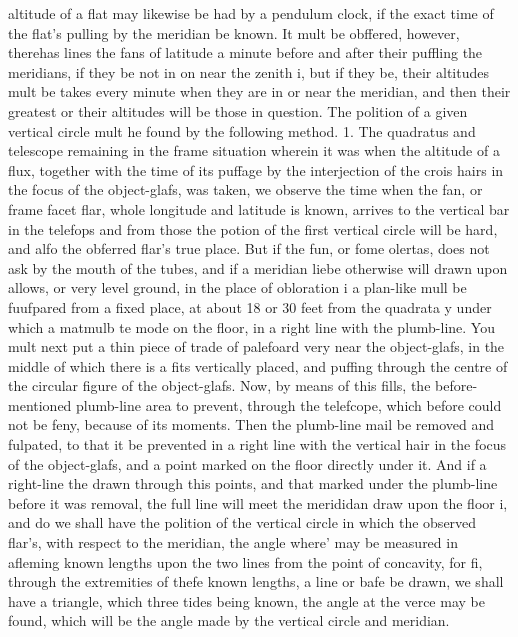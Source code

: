 altitude of a flat may likewise be had by a pendulum clock, if the exact time of the flat’s pulling by the meridian be known. It mult be obffered, however, therehas lines the fans of latitude a minute before and after their puffling the meridians, if they be not in on near the zenith i, but if they be, their altitudes mult be takes every minute when they are in or near the meridian, and then their greatest or their altitudes will be those in question. The polition of a given vertical circle mult he found by the following method. 1. The quadratus and telescope remaining in the frame situation wherein it was when the altitude of a flux, together with the time of its puffage by the interjection of the crois hairs in the focus of the object-glafs, was taken, we observe the time when the fan, or frame facet flar, whole longitude and latitude is known, arrives to the vertical bar in the telefops and from those the potion of the first vertical circle will be hard, and alfo the obferred flar's true place. But if the fun, or fome olertas, does not ask by the mouth of the tubes, and if a meridian liebe otherwise will drawn upon allows, or very level ground, in the place of obloration i a plan-like mull be fuufpared from a fixed place, at about 18 or 30 feet from the quadrata y under which a matmulb te mode on the floor, in a right line with the plumb-line. You mult next put a thin piece of trade of palefoard very near the object-glafs, in the middle of which there is a fits vertically placed, and puffing through the centre of the circular figure of the object-glafs. Now, by means of this fills, the before-mentioned plumb-line area to prevent, through the telefcope, which before could not be feny, because of its moments. Then the plumb-line mail be removed and fulpated, to that it be prevented in a right line with the vertical hair in the focus of the object-glafs, and a point marked on the floor directly under it. And if a right-line the drawn through this points, and that marked under the plumb-line before it was removal, the full line will meet the merididan draw upon the floor i, and do we shall have the polition of the vertical circle in which the observed flar's, with respect to the meridian, the angle where' may be measured in afleming known lengths upon the two lines from the point of concavity, for fi, through the extremities of thefe known lengths, a line or bafe be drawn, we shall have a triangle, which three tides being known, the angle at the verce may be found, which will be the angle made by the vertical circle and meridian.\par\medskip
